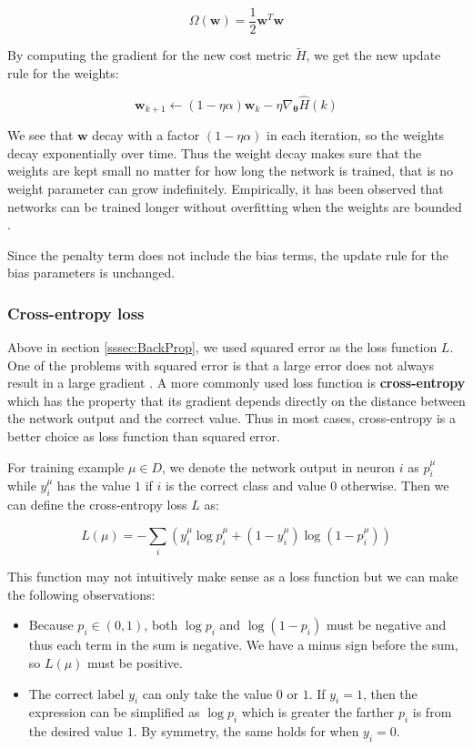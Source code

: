 \[
\Omega(\mathbf{w}) = \frac{1}{2} \mathbf{w}^T \mathbf{w}
\]

By computing the gradient for the new cost metric $\tilde{H}$, we get the new update rule for the weights:

\[
\mathbf{w}_{k+1} \leftarrow
(1 - \eta \alpha) \mathbf{w}_k - \eta \nabla_{\mathbf{\theta}} \hat{H}(k)
\]

We see that $\mathbf{w}$ decay with a factor $(1 - \eta \alpha)$ in each iteration, so the weights decay exponentially over time. Thus the weight decay makes sure that the weights are kept small no matter for how long the network is trained, that is no weight parameter can grow indefinitely. Empirically, it has been observed that networks can be trained longer without overfitting when the weights are bounded \cite[Chapter~3]{NielsenBook}.

Since the penalty term does not include the bias terms, the update rule for the bias parameters is unchanged.


\subsubsection{Cross-entropy loss}

Above in section \ref{sssec:BackProp}, we used squared error as the loss function $L$. One of the problems with squared error is that a large error does not always result in a large gradient \cite[Chapter~3]{NielsenBook}.
A more commonly used loss function is \textbf{cross-entropy} which has the property that its gradient depends directly on the distance between the network output and the correct value.
Thus in most cases, cross-entropy is a better choice as loss function than squared error.

For training example $\mu \in D$, we denote the network output in neuron $i$ as $p_i^\mu$ while $y_i^\mu$ has the value $1$ if $i$ is the correct class and value $0$ otherwise. Then we can define the cross-entropy loss $L$ as:

\[
L(\mu) = - \sum_i \left(
  y_i^\mu \log p_i^\mu + (1 - y_i^\mu) \log (1 - p_i^\mu)
\right)
\]

This function may not intuitively make sense as a loss function but we can make the following observations:

\begin{itemize}
    \item Because $p_i \in (0, 1)$, both $\log p_i$ and $\log (1 - p_i)$ must be negative and thus each term in the sum is negative. We have a minus sign before the sum, so $L(\mu)$ must be positive.
    \item The correct label $y_i$ can only take the value $0$ or $1$. If $y_i=1$, then the expression can be simplified as $\log p_i$ which is greater the farther $p_i$ is from the desired value $1$. By symmetry, the same holds for when $y_i = 0$.
\end{itemize}

